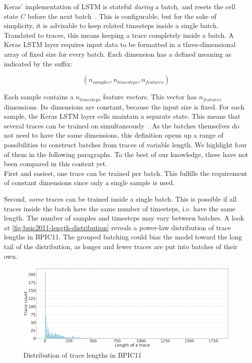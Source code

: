 Keras' implementation of LSTM is stateful \textit{during} a batch, and resets the cell state $C$ before the next batch~\cite{web:keras}. This is configurable, but for the sake of simplicity, it is advisable to keep related timesteps inside a single batch. Translated to traces, this means keeping a trace completely inside a batch. A Keras LSTM layer requires input data to be formatted in a three-dimensional array of fixed size for every batch. Each dimension has a defined meaning as indicated by the suffix:

$$(n_{samples}, n_{timesteps}, n_{features})$$

Each sample contains a $n_{timesteps}$ feature vectors.
This vector has $n_{features}$ dimensions.
Its dimensions are constant, because the input size is fixed.
For each sample, the Keras LSTM layer cells maintain a separate state.
This means that several traces can be trained on simultaneously~\cite{web:keras-lstm-state}.
As the batches themselves do not need to have the same dimensions, this definition opens up a range of possibilities to construct batches from traces of variable length.
We highlight four of them in the following paragraphs.
To the best of our knowledge, these have not been compared in this context yet.\\

First and easiest, one trace can be trained per batch. This fulfills the requirement of constant dimensions since only a single sample is used.

Second, \textit{some} traces can be trained inside a single batch. This is possible if all traces inside the batch have the same number of timesteps, i.e. have the same length. The number of samples and timesteps may vary between batches. A look at \autoref{fig:bpic2011-length-distribution} reveals a power-law distribution of trace lengths in BPIC11.
The grouped batching could bias the model toward the long tail of the distribution, as longer and fewer traces are put into batches of their own.

\begin{figure}[ht!]
    \centering
    \includegraphics[width=.9\textwidth]{gfx/frequency-distribution.png}
    \caption{Distribution of trace lengths in BPIC11}
    \label{fig:bpic2011-length-distribution}
\end{figure}

